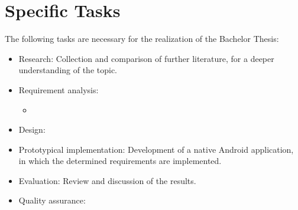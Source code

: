 \section{Specific Tasks}
\label{sec:specific-tasks}

The following tasks are necessary for the realization of the Bachelor Thesis:
%
\begin{itemize}
    \item Research: Collection and comparison of further literature, for a deeper understanding of the topic.
    \item Requirement analysis:
        \begin{itemize}
        	\item
        \end{itemize}
    \item Design:
    \item Prototypical implementation: Development of a native Android application, in which the determined requirements are implemented.
    \item Evaluation: Review and discussion of the results.
    \item Quality assurance:
\end{itemize}